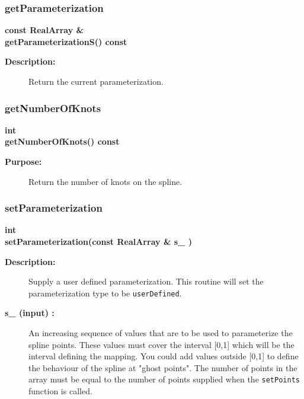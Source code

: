 \subsubsection{getParameterization}
 
\begin{flushleft} \textbf{%
const RealArray \&  \\ 
\settowidth{\SplineMappingIncludeArgIndent}{getParameterizationS(}%
getParameterizationS() const
}\end{flushleft}
\begin{description}
\item[{\bf Description:}] 
   Return the current parameterization.
\end{description}
\subsubsection{getNumberOfKnots}
 
\begin{flushleft} \textbf{%
int  \\ 
\settowidth{\SplineMappingIncludeArgIndent}{getNumberOfKnots(}%
getNumberOfKnots() const
}\end{flushleft}
\begin{description}
\item[{\bf Purpose:}]  
    Return the number of knots on the spline. 
\end{description}
\subsubsection{setParameterization}
 
\begin{flushleft} \textbf{%
int   \\ 
\settowidth{\SplineMappingIncludeArgIndent}{setParameterization(}%
setParameterization(const RealArray \& s\_ )
}\end{flushleft}
\begin{description}
\item[{\bf Description:}] 
   Supply a user defined parameterization. This routine will set the parameterization type
 to be {\tt userDefined}.
\item[{\bf s\_ (input) :}]  An increasing sequence of values that are to be
     used to parameterize the spline points. These values must cover the interval [0,1] which
   will be the interval defining the mapping. You could add values outside [0,1] to define the
 behaviour of the spline at "ghost points".  The number of points in the array must
     be equal to the number of points supplied when the {\tt setPoints} function is called.
\end{description}
